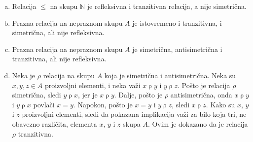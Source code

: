 {{\begin{enumerate}[(a)]
Umesto gorenavedenog primera, mogli smo i konstruisati relaciju $\sigma$ nad skupom $\mathbb N$ takvu da je $x\mathrel\sigma y$ akko
$\lvert x-y\rvert\leq 1$. Lako se vidi da je $\sigma$ simetri\v cna i refleksivna relacija, a po\v sto je $1\mathrel\sigma 2$ i $2\mathrel\sigma 3$, a nije $1\mathrel\sigma 3$, relacija $\sigma$ nije i tranzitivna.
\item Relacija $\leq$ na skupu $\mathbb N$ je refleksivna i tranzitivna relacija, a nije simetri\v cna.
\item Prazna relacija na nepraznom skupu $A$ je istovremeno i tranzitivna, i simetri\v cna, ali nije refleksivna. 
\item Prazna relacija  na nepraznom skupu $A$  je simetri\v cna, antisimetri\v cna i tranzitivna, ali nije refleksivna.
\item Neka je $\rho$ relacija na skupu $A$ koja je simetri\v cna i antisimetri\v cna. Neka su $x,y,z\in A$ proizvoljni elementi, i neka va\v zi $x\mathrel\rho y$ i $y\mathrel\rho z$. Po\v sto je relacija $\rho$ simetri\v cna, sledi $y\mathrel\rho x$, jer je $x\mathrel\rho y$. Dalje, po\v sto je $\rho$ antisimetri\v cna, onda $x\mathrel\rho y$ i $y\mathrel\rho x$ povla\v ci $x=y$. Napokon, po\v sto je $x=y$ i $y\mathrel\rho z$, sledi $x\mathrel\rho z$. Kako su $x$, $y$ i $z$ proizvoljni elementi, sledi da pokazana implikacija va\v zi za bilo koja tri, ne obavezno razli\v cita, elementa $x$, $y$ i $z$ skupa $A$. Ovim je dokazano da je relacija $\rho$ tranzitivna. 
\end{enumerate}
}

\clearpage
{}}
